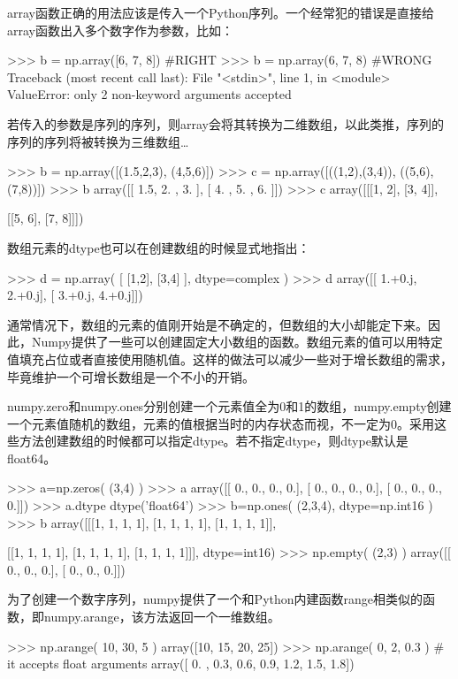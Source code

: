 array函数正确的用法应该是传入一个Python序列。一个经常犯的错误是直接给array函数出入多个数字作为参数，比如：
\begin{python}
>>> b = np.array([6, 7, 8])    #RIGHT
>>> b = np.array(6, 7, 8)      #WRONG
Traceback (most recent call last):
  File "<stdin>", line 1, in <module>
ValueError: only 2 non-keyword arguments accepted
\end{python}

若传入的参数是序列的序列，则array会将其转换为二维数组，以此类推，序列的序列的序列将被转换为三维数组\ldots
\begin{python}
>>> b = np.array([(1.5,2,3), (4,5,6)])
>>> c = np.array([((1,2),(3,4)), ((5,6),(7,8))])
>>> b
array([[ 1.5,  2. ,  3. ],
       [ 4. ,  5. ,  6. ]])
>>> c
array([[[1, 2],
        [3, 4]],

       [[5, 6],
        [7, 8]]])
\end{python}

数组元素的dtype也可以在创建数组的时候显式地指出：
\begin{python}
>>> d = np.array( [ [1,2], [3,4] ], dtype=complex )
>>> d
array([[ 1.+0.j,  2.+0.j],
       [ 3.+0.j,  4.+0.j]])
\end{python}

通常情况下，数组的元素的值刚开始是不确定的，但数组的大小却能定下来。因此，Numpy提供了一些可以创建固定大小数组的函数。数组元素的值可以用特定值填充占位或者直接使用随机值。这样的做法可以减少一些对于增长数组的需求，毕竟维护一个可增长数组是一个不小的开销。

numpy.zero和numpy.ones分别创建一个元素值全为0和1的数组，numpy.empty创建一个元素值随机的数组，元素的值根据当时的内存状态而视，不一定为0。采用这些方法创建数组的时候都可以指定dtype。若不指定dtype，则dtype默认是float64。
\begin{python}
>>> a=np.zeros( (3,4) )
>>> a
array([[ 0.,  0.,  0.,  0.],
       [ 0.,  0.,  0.,  0.],
       [ 0.,  0.,  0.,  0.]])
>>> a.dtype
dtype('float64')
>>> b=np.ones( (2,3,4), dtype=np.int16 )
>>> b
array([[[1, 1, 1, 1],
        [1, 1, 1, 1],
        [1, 1, 1, 1]],

       [[1, 1, 1, 1],
        [1, 1, 1, 1],
        [1, 1, 1, 1]]], dtype=int16)
>>> np.empty( (2,3) )
array([[ 0.,  0.,  0.],
       [ 0.,  0.,  0.]])
\end{python}

为了创建一个数字序列，numpy提供了一个和Python内建函数range相类似的函数，即numpy.arange，该方法返回一个一维数组。
\begin{python}
>>> np.arange( 10, 30, 5 )
array([10, 15, 20, 25])
>>> np.arange( 0, 2, 0.3 ) # it accepts float arguments
array([ 0. , 0.3, 0.6, 0.9, 1.2, 1.5, 1.8])
\end{python}

